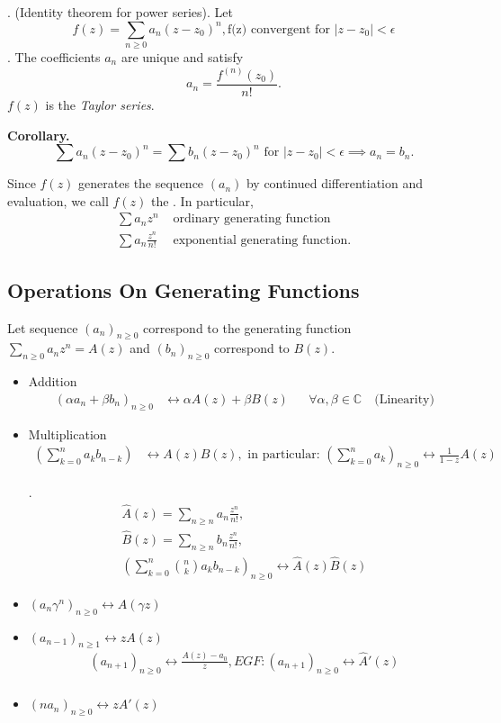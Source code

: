 \Theorem. (Identity theorem for power series).
Let
\[
    f(z) = \sum_{n≥0} a_n (z-z_0)^n,
    \text{f(z) convergent for $|z-z_0| < \epsilon$}
\].
The coefficients $a_n$ are unique and satisfy
\[
    a_n = \frac{f^{(n)}(z_0)}{n!}.
\]
$f(z)$ is the \emph{Taylor series}.

\textbf{Corollary.}
\[
    \sum a_n (z-z_0)^n =
    \sum b_n (z-z_0)^n
    \text{ for } |z-z_0| < \epsilon
    \implies
    a_n = b_n.
\]

Since $f(z)$ generates the sequence $(a_n)$ by continued differentiation and evaluation, we call $f(z)$ the . In particular,
\begin{align*}
\sum a_n z^n & \text{ ordinary generating function} \\
\sum a_n \frac{z^n}{n!} & \text{ exponential generating function.}
\end{align*}


\subsection{Operations On Generating Functions}

Let sequence $(a_n)_{n≥0}$ correspond to the generating function $\displaystyle{\sum_{n≥0} a_n z^n = A(z)}$ and $(b_n)_{n≥0}$ correspond to $B(z)$.

\begin{itemize}
\item Addition
\begin{align*}
    (\alpha a_n + \beta b_n)_{n≥0}
        &\leftrightarrow \alpha A(z) + \beta B(z)
        &&\forall \alpha, \beta \in \mathbb{C}
        \quad\text{(Linearity)}
\end{align*}
\item Multiplication
\begin{align*}
    \left(\sum_{k=0}^{n} a_k b_{n-k} \right)
        &\leftrightarrow A(z) B(z),
        \text{ in particular: }
        \left(\sum_{k=0}^n a_k\right)_{n≥0} \leftrightarrow \frac{1}{1-z} A(z)
\end{align*}

\Remark.
\begin{align*}
    \hat{A}(z) = \sum_{n \geq n} a_n \frac{z^n}{n!}, \\
    \hat{B}(z) = \sum_{n \geq n} b_n \frac{z^n}{n!}, \\
    \left(\sum_{k=0}^n \binom{n}{ k} a_k b_{n-k}\right)_{n \geq 0}
        \leftrightarrow \hat A(z)\hat B(z)
\end{align*}

\item $
    (a_n \gamma^n)_{n≥0}
        ↔ A(\gamma z) $
\item $ (a_{n-1})_{n≥1}↔ z A(z)$
\begin{align*}
        (a_{n+1})_{n≥0} ↔ \frac{A(z)-a_0}z,
        EGF: (a_{n+1})_{n≥0} ↔ \hat A'(z) \\
\end{align*}
\item $(n a_n)_{n≥0}↔ z A'(z)$

\end{itemize}

